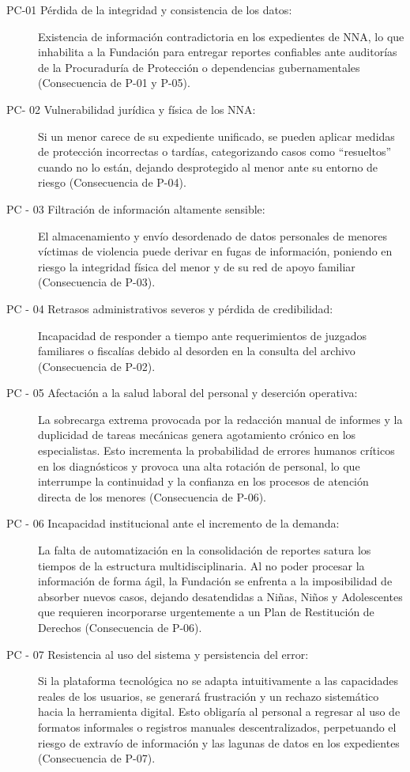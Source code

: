 \begin{description}
	\item[PC-01 Pérdida de la integridad y consistencia de los datos:] Existencia de información contradictoria en los expedientes de NNA, lo que inhabilita a la Fundación para entregar reportes confiables ante auditorías de la Procuraduría de Protección o dependencias gubernamentales (Consecuencia de P-01 y P-05).
	\item[PC- 02 Vulnerabilidad jurídica y física de los NNA:] Si un menor carece de su expediente unificado, se pueden aplicar medidas de protección incorrectas o tardías, categorizando casos como ``resueltos'' cuando no lo están, dejando desprotegido al menor ante su entorno de riesgo (Consecuencia de P-04).
	\item[PC - 03 Filtración de información altamente sensible:] El almacenamiento y envío desordenado de datos personales de menores víctimas de violencia puede derivar en fugas de información, poniendo en riesgo la integridad física del menor y de su red de apoyo familiar (Consecuencia de P-03).
	\item[PC - 04 Retrasos administrativos severos y pérdida de credibilidad:] Incapacidad de responder a tiempo ante requerimientos de juzgados familiares o fiscalías debido al desorden en la consulta del archivo (Consecuencia de P-02).
	\item[PC - 05 Afectación a la salud laboral del personal y deserción operativa:] La sobrecarga extrema provocada por la redacción manual de informes y la duplicidad de tareas mecánicas genera agotamiento crónico en los especialistas. Esto incrementa la probabilidad de errores humanos críticos en los diagnósticos y provoca una alta rotación de personal, lo que interrumpe la continuidad y la confianza en los procesos de atención directa de los menores (Consecuencia de P-06).
	\item[PC - 06 Incapacidad institucional ante el incremento de la demanda:] La falta de automatización en la consolidación de reportes satura los tiempos de la estructura multidisciplinaria. Al no poder procesar la información de forma ágil, la Fundación se enfrenta a la imposibilidad de absorber nuevos casos, dejando desatendidas a Niñas, Niños y Adolescentes que requieren incorporarse urgentemente a un Plan de Restitución de Derechos (Consecuencia de P-06).
	\item[PC - 07 Resistencia al uso del sistema y persistencia del error:] Si la plataforma tecnológica no se adapta intuitivamente a las capacidades reales de los usuarios, se generará frustración y un rechazo sistemático hacia la herramienta digital. Esto obligaría al personal a regresar al uso de formatos informales o registros manuales descentralizados, perpetuando el riesgo de extravío de información y las lagunas de datos en los expedientes (Consecuencia de P-07).
\end{description}

